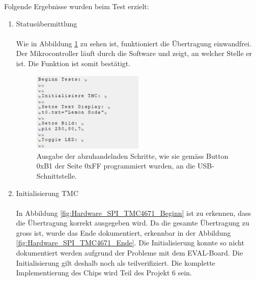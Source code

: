 Folgende Ergebnisse wurden beim Test erzielt:
\begin{enumerate}
\item Statusübermittlung\\
\\
Wie in Abbildung \ref{fig:Hardware_Uart_0_0} zu sehen ist, funktioniert die Übertragung einwandfrei. Der Mikrocontroller läuft durch die Software und zeigt, an welcher Stelle er ist. Die Funktion ist somit bestätigt.

\begin{figure}[h!]
	\centering	\includegraphics[width=0.5\textwidth]{graphics/Test_UART0_0.png}
	\caption{Ausgabe der abzuhandelnden Schritte, wie sie gemäss Button 0xB1 der Seite 0xFF programmiert wurden, an die USB-Schnittstelle.} 
	\label{fig:Hardware_Uart_0_0}
\end{figure}

\newpage

\item Initialisierung TMC\\
\\
In Abbildung \ref{fig:Hardware_SPI_TMC4671_Beginn} ist zu erkennen, dass die Übertragung korrekt ausgegeben wird. Da die gesamte Übertragung zu gross ist, wurde das Ende dokumentiert, erkennbar in der Abbildung \ref{fig:Hardware_SPI_TMC4671_Ende}. Die Initialisierung konnte so nicht dokumentiert werden aufgrund der Probleme mit dem EVAL-Board. Die Initialisierung gilt deshalb noch als teilverifiziert. Die komplette Implementierung des Chips wird Teil des Projekt 6 sein.


\end{enumerate}
